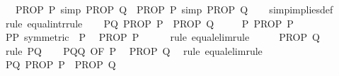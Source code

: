 \begin{isabellebody}
\ \ \ {\isachardoublequoteopen}{\isacharparenleft}{\kern0pt}PROP\ P\ {\isacharequal}{\kern0pt}simp{\isacharequal}{\kern0pt}{\isachargreater}{\kern0pt}\ PROP\ Q{\isacharparenright}{\kern0pt}\ {\isasymequiv}\ {\isacharparenleft}{\kern0pt}PROP\ P{\isacharprime}{\kern0pt}\ {\isacharequal}{\kern0pt}simp{\isacharequal}{\kern0pt}{\isachargreater}{\kern0pt}\ PROP\ Q{\isacharprime}{\kern0pt}{\isacharparenright}{\kern0pt}{\isachardoublequoteclose}\isanewline
%
\isadelimproof
\ \ %
\endisadelimproof
%
\isatagproof
{}\isamarkupfalse%
\ simp{\isacharunderscore}{\kern0pt}implies{\isacharunderscore}{\kern0pt}def\isanewline
{}\isamarkupfalse%
\ {\isacharparenleft}{\kern0pt}rule\ equal{\isacharunderscore}{\kern0pt}intr{\isacharunderscore}{\kern0pt}rule{\isacharparenright}{\kern0pt}\isanewline
\ \ \isamarkupfalse%
\ PQ{\isacharcolon}{\kern0pt}\ {\isachardoublequoteopen}PROP\ P\ {\isasymLongrightarrow}\ PROP\ Q{\isachardoublequoteclose}\isanewline
\ \ \ \ \ P{\isacharprime}{\kern0pt}{\isacharcolon}{\kern0pt}\ {\isachardoublequoteopen}PROP\ P{\isacharprime}{\kern0pt}{\isachardoublequoteclose}\isanewline
\ \ \isamarkupfalse%
\ PP{\isacharprime}{\kern0pt}\ {\isacharbrackleft}{\kern0pt}symmetric{\isacharbrackright}{\kern0pt}\ \ P{\isacharprime}{\kern0pt}\ \isamarkupfalse%
\ {\isachardoublequoteopen}PROP\ P{\isachardoublequoteclose}\isanewline
\ \ \ \ \isamarkupfalse%
\ {\isacharparenleft}{\kern0pt}rule\ equal{\isacharunderscore}{\kern0pt}elim{\isacharunderscore}{\kern0pt}rule{}{\isacharparenright}{\kern0pt}\isanewline
\ \ \isamarkupfalse%
\ \isamarkupfalse%
\ {\isachardoublequoteopen}PROP\ Q{\isachardoublequoteclose}\ \isamarkupfalse%
\ {\isacharparenleft}{\kern0pt}rule\ PQ{\isacharparenright}{\kern0pt}\isanewline
\ \ \isamarkupfalse%
\ P{\isacharprime}{\kern0pt}QQ{\isacharprime}{\kern0pt}\ {\isacharbrackleft}{\kern0pt}OF\ P{\isacharprime}{\kern0pt}{\isacharbrackright}{\kern0pt}\ \isamarkupfalse%
\ {\isachardoublequoteopen}PROP\ Q{\isacharprime}{\kern0pt}{\isachardoublequoteclose}\ \isamarkupfalse%
\ {\isacharparenleft}{\kern0pt}rule\ equal{\isacharunderscore}{\kern0pt}elim{\isacharunderscore}{\kern0pt}rule{}{\isacharparenright}{\kern0pt}\isanewline
{}\isamarkupfalse%
\isanewline
\ \ \isamarkupfalse%
\ P{\isacharprime}{\kern0pt}Q{\isacharprime}{\kern0pt}{\isacharcolon}{\kern0pt}\ {\isachardoublequoteopen}PROP\ P{\isacharprime}{\kern0pt}\ {\isasymLongrightarrow}\ PROP\ Q{\isacharprime}{\kern0pt}{\isachardoublequoteclose}\isanewline

\end{isabellebody}
